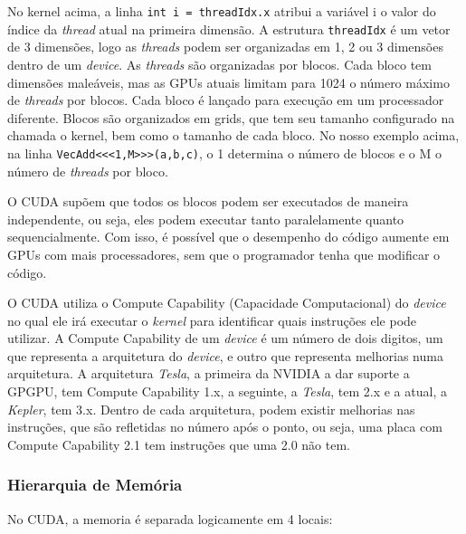 No kernel acima, a linha \verb#int i = threadIdx.x# atribui a variável i o valor do índice da \textit{thread} atual na primeira dimensão. 
A estrutura \verb#threadIdx# é um vetor de 3 dimensões, logo as \textit{threads} podem ser organizadas em 1, 2 ou 3 dimensões dentro de um
\textit{device}. As \textit{threads} são organizadas por blocos. Cada bloco tem dimensões maleáveis, mas as GPUs atuais limitam para 1024 o 
número máximo de \textit{threads} por blocos. Cada bloco é lançado para execução em um processador diferente. Blocos são organizados em 
grids, que tem seu tamanho configurado na chamada o kernel, bem como o tamanho de cada bloco. No nosso exemplo acima, na linha
\verb#VecAdd<<<1,M>>>(a,b,c)#, o 1 determina o número de blocos e o M o número de \textit{threads} por bloco.

O CUDA supõem que todos os blocos podem ser executados de maneira independente, ou seja, eles podem executar tanto paralelamente
quanto sequencialmente. Com isso, é possível que o desempenho do código aumente em GPUs com mais processadores, sem que o programador
tenha que modificar o código.

O CUDA utiliza o Compute Capability (Capacidade Computacional) do \textit{device} no qual ele irá executar o \textit{kernel}
para identificar quais instruções ele pode utilizar. A Compute Capability de um \textit{device} é um número de dois digitos,
um que representa a arquitetura do \textit{device}, e outro que representa melhorias numa arquitetura.
A arquitetura \textit{Tesla}, a primeira da NVIDIA a dar suporte a GPGPU, tem Compute Capability 1.x, a seguinte, a \textit{Tesla},
tem 2.x e a atual, a \textit{Kepler}, tem 3.x. Dentro de cada arquitetura, podem existir melhorias nas instruções, que são
refletidas no número após o ponto, ou seja, uma placa com Compute Capability 2.1 tem instruções que uma 2.0 não tem.

\subsubsection{Hierarquia de Memória}
No CUDA, a memoria é separada logicamente em 4 locais:

